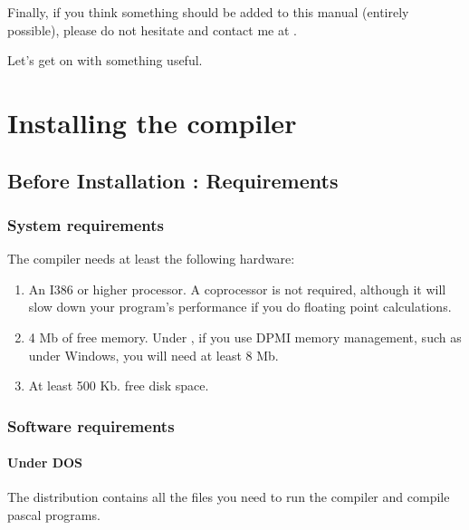 \documentclass{report}
\begin{document}
Finally, if you think something should be added to this manual 
(entirely possible), please do not hesitate and contact me at 
.

Let's get on with something useful.


\chapter{Installing the compiler}

\section{Before Installation : Requirements}

%
%

\subsection{System requirements}
The compiler needs at least the following hardware:
\begin{enumerate}
\item An I386 or higher processor. A coprocessor is not required, although it
will slow down your program's performance if you do floating point calculations.
\item 4 Mb of free memory. Under \dos, if you use DPMI memory management,
such as under Windows, you will need at least 8 Mb.
\item At least 500 Kb. free disk space.
\end{enumerate}

%
%

\subsection{Software requirements}

\subsubsection{Under DOS}
The \dos distribution contains all the files you need to run the compiler
and compile pascal programs.
\end{document}

